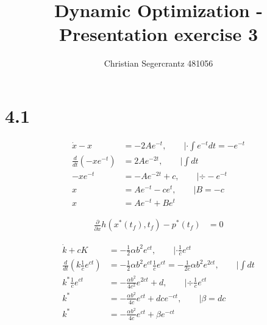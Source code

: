 \documentclass{article}
\title{Dynamic Optimization - Presentation exercise 3}
\author{Christian Segercrantz 481056}
\begin{document}
	\maketitle
	\pagebreak

\section*{4.1}
	

\begin{align}
	\dot{x} - x &= -2Ae^{-t}, \qquad | \cdot \int e^{-t} dt = -e^{-t}\\
	\frac{d}{dt}(-x e^{-t}) &= 2Ae^{-2t} , \qquad | \int dt\\
	-x e^{-t} &= -Ae^{-2t} + c , \qquad | \div -e^{-t}\\
	x &= Ae^{-t} - ce^{t} , \qquad | B = -c\\
	x &= Ae^{-t} + Be^{t}
\end{align}

\begin{align}
	\frac{\partial}{\partial x}h(x^*(t_f),t_f) - p^*(t_f) &= 0
\end{align}

\begin{align}
	\dot{k} + cK &= -\frac{1}{2}\alpha b^2 e^{ct}, \qquad | \cdot \frac{1}{c}e^{ct}\\
	\frac{d}{dt}\left(k \frac{1}{c}e^{ct}\right) &= -\frac{1}{2}\alpha b^2 e^{ct} \frac{1}{c}e^{ct} = -\frac{1}{2c}\alpha b^2e^{2ct}, \qquad | \int dt\\
	k^* \frac{1}{c}e^{ct} &= -\frac{\alpha b^2}{4c^2} e^{2ct} + d, \qquad | \div \frac{1}{c}e^{ct}\\
	k^* &= -\frac{\alpha b^2}{4c}e^{ct} + d ce^{-ct}, \qquad | \beta = d c\\
	k^* &= -\frac{\alpha b^2}{4c}e^{ct} + \beta e^{-ct}
\end{align}

	
\end{document}
